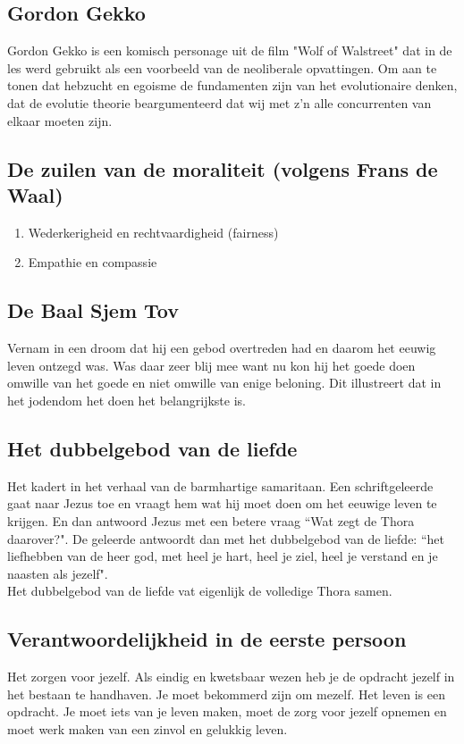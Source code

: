 \documentclass[11pt,a4paper,titlepage]{article}
\begin{document}
\subsection{Gordon Gekko}
Gordon Gekko is een komisch personage uit de film "Wolf of Walstreet" dat in de les werd gebruikt als een voorbeeld van de neoliberale opvattingen. Om aan te tonen dat hebzucht en egoisme de fundamenten zijn van het evolutionaire denken, dat de evolutie theorie beargumenteerd dat wij met z'n alle concurrenten van elkaar moeten zijn.

\subsection{De zuilen van de moraliteit (volgens Frans de Waal)}
\begin{enumerate}
\item Wederkerigheid en rechtvaardigheid (fairness)
\item Empathie en compassie
\end{enumerate}

\subsection{De Baal Sjem Tov}
Vernam in een droom dat hij een gebod overtreden had en daarom het eeuwig leven ontzegd was. Was daar zeer blij mee want nu kon hij het goede doen omwille van het goede en niet omwille van enige beloning. Dit illustreert dat in het jodendom het doen het belangrijkste is.

\subsection{Het dubbelgebod van de liefde}
Het kadert in het verhaal van de barmhartige samaritaan. Een schriftgeleerde gaat naar Jezus toe en vraagt hem wat hij moet doen om het eeuwige leven te krijgen. En dan antwoord Jezus met een betere vraag ``Wat zegt de Thora daarover?". De geleerde antwoordt  dan met het dubbelgebod van de liefde: ``het liefhebben van de heer god, met heel je hart, heel je ziel, heel je verstand en je naasten als jezelf".\\
Het dubbelgebod van de liefde vat eigenlijk de volledige Thora samen.

\subsection{Verantwoordelijkheid in de eerste persoon}
Het zorgen voor jezelf. Als eindig en kwetsbaar wezen heb je de opdracht jezelf in het bestaan te handhaven. Je moet bekommerd zijn om mezelf. Het leven is een opdracht. Je moet iets van je leven maken, moet de zorg voor jezelf opnemen en moet werk maken van een zinvol en gelukkig leven.
\end{document}
